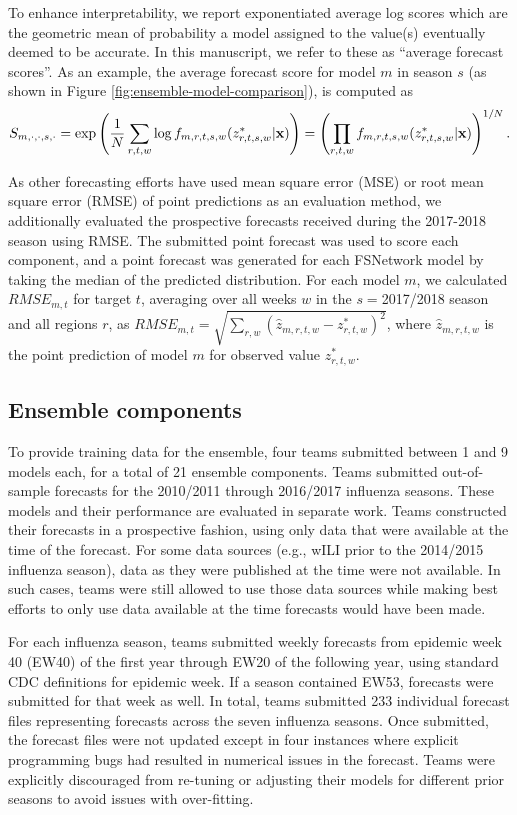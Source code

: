 \documentclass{article}\usepackage[]{graphicx}\usepackage[]{color}
\begin{document}
To enhance interpretability, we report exponentiated average log scores which are the geometric mean of probability a model assigned to the value(s) eventually deemed to be accurate. In this manuscript, we refer to these as ``average forecast scores''. As an example, the average forecast score for model $m$ in season $s$ (as shown in Figure \ref{fig:ensemble-model-comparison}), is computed as 
\begin{equation}
S_{m,\cdot,\cdot,s,\cdot} = \exp \left ( \frac{1}{N} \sum_{r,t,w} \log f_{m,r,t,s,w}(z^*_{r,t,s,w}|{\bf x}) \right ) 
  =  \left ( \prod_{r,t,w}  f_{m,r,t,s,w}(z^*_{r,t,s,w}|{\bf x}) \right ) ^{1/N}. 
\end{equation}

As other forecasting efforts have used mean square error (MSE) or root mean square error (RMSE) of point predictions as an evaluation method, we additionally evaluated the prospective forecasts received during the 2017-2018 season using RMSE. The submitted point forecast was used to score each component, and a point forecast was generated for each FSNetwork model by taking the median of the predicted distribution. For each model $m$, we calculated $RMSE_{m,t}$ for target $t$, averaging over all weeks $w$ in the $s=$2017/2018 season and all regions $r$, as $RMSE_{m,t} = \sqrt{\sum_{r,w}(\hat z_{m,r,t,w} - z^*_{r,t,w})^2}$, where $\hat z_{m,r,t,w}$ is the point prediction of model $m$ for observed value $z^*_{r,t,w}$.

\subsection{Ensemble components}
To provide training data for the ensemble, four teams submitted between 1 and 9 models each, for a total of 21 ensemble components. Teams submitted out-of-sample forecasts for the 2010/2011 through 2016/2017 influenza seasons. These models and their performance are evaluated in separate work.\cite{Reich2018} Teams constructed their forecasts in a prospective fashion, using only data that were available at the time of the forecast. For some data sources (e.g., wILI prior to the 2014/2015 influenza season), data as they were published at the time were not available. In such cases, teams were still allowed to use those data sources while making best efforts to only use data available at the time forecasts would have been made.

For each influenza season, teams submitted weekly forecasts from epidemic week 40 (EW40) of the first year through EW20 of the following year, using standard CDC definitions for epidemic week.\cite{NewMexicoDepartmentofHealth,Niemi2015,Tushar2018} If a season contained EW53, forecasts were submitted for that week as well. In total, teams submitted 233 individual forecast files representing forecasts across the seven influenza seasons. Once submitted, the forecast files were not updated except in four instances where explicit programming bugs had resulted in numerical issues in the forecast. Teams were explicitly discouraged from re-tuning or adjusting their models for different prior seasons to avoid issues with over-fitting.
\end{document}
